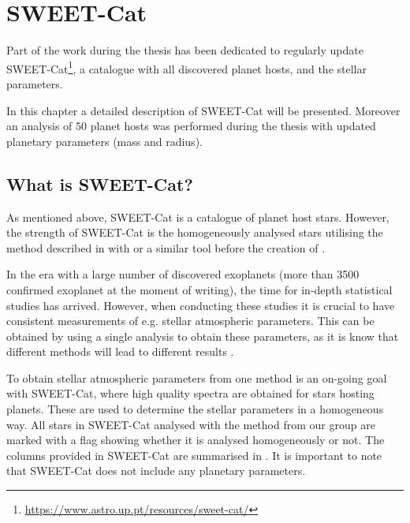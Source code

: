 

\chapter{SWEET-Cat}
\label{sec:SWEET-Cat}

Part of the work during the thesis has been dedicated to regularly update
SWEET-Cat\footnote{\url{https://www.astro.up.pt/resources/sweet-cat/}}, a catalogue with all
discovered planet hosts, and the stellar parameters.

In this chapter a detailed description of SWEET-Cat will be presented. Moreover an analysis of 50
planet hosts was performed during the thesis with updated planetary parameters (mass and radius).


\section{What is SWEET-Cat?}

As mentioned above, SWEET-Cat is a catalogue of planet host stars. However, the strength of
SWEET-Cat is the homogeneously analysed stars utilising the method described in
 with  or a similar tool before the creation of .

In the era with a large number of discovered exoplanets (more than 3500 confirmed exoplanet at the
moment of writing), the time for in-depth statistical studies has arrived. However, when conducting
these studies it is crucial to have consistent measurements of e.g. stellar atmospheric parameters.
This can be obtained by using a single analysis to obtain these parameters, as it is know that
different methods will lead to different results \citep[see e.g.][for a recent review]{Hinkel2016}.

To obtain stellar atmospheric parameters from one method is an on-going goal with SWEET-Cat, where
high quality spectra are obtained for stars hosting planets. These are used to determine the stellar
parameters in a homogeneous way. All stars in SWEET-Cat analysed with the method from our group are
marked with a flag showing whether it is analysed homogeneously or not. The columns provided in
SWEET-Cat are summarised in . It is important to note that SWEET-Cat does not
include any planetary parameters.


